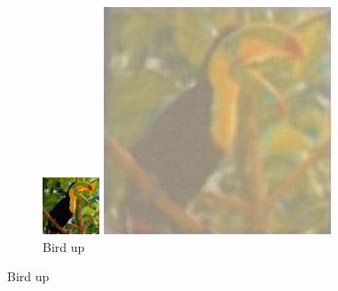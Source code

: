 \documentclass[11pt,twocolumn,twoside,paper=a4]{IEEEtran}
\begin{document}
\begin{figure}[ht]
\par\bigskip

\begin{subfigure}{0.45\textwidth}
  \centering
  \begin{minipage}[b]{0.45\textwidth}
    \includegraphics[width=\textwidth]{../images/bird_low.jpg}
    \caption{Bird low}
  \end{minipage}
  \hfill
  \begin{minipage}[b]{0.45\textwidth}
    \includegraphics[width=\textwidth]{../images/bird_up.jpg}
    \caption{Bird up}
  \end{minipage}
\end{subfigure}


\end{figure}
\end{document}
